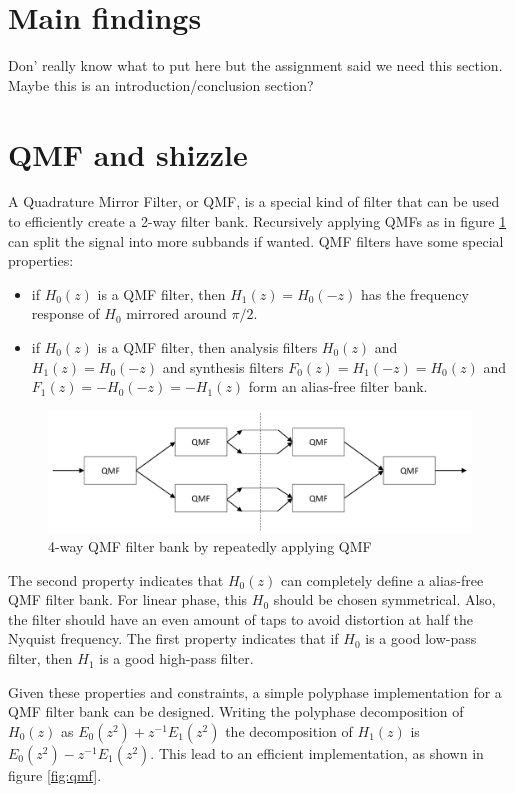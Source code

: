 \documentclass[a4paper]{article}
\begin{document}
\section{Main findings}
Don' really know what to put here but the assignment said we need this section. Maybe this is an introduction/conclusion section?

\section{QMF and shizzle}
A Quadrature Mirror Filter, or QMF, is a special kind of filter that can be used to efficiently create a 2-way filter bank. Recursively applying QMFs as in figure \ref{fig:qmfrecursive} can split the signal into more subbands if wanted. QMF filters have some special properties:
\begin{itemize}
\item if $H_0(z)$ is a QMF filter, then $H_1(z) = H_0(-z)$ has the frequency response of $H_0$ mirrored around $\pi/2$.
\item if $H_0(z)$ is a QMF filter, then analysis filters $H_0(z)$ and $H_1(z) = H_0(-z)$ and synthesis filters $F_0(z)=H_1(-z)=H_0(z)$ and $F_1(z)=-H_0(-z) = -H_1(z)$ form an alias-free filter bank.
\end{itemize}
\begin{figure}[hbt]
\centering
\includegraphics[width=.8\textwidth]{qmfrecursive}
\caption{4-way QMF filter bank by repeatedly applying QMF}
\label{fig:qmfrecursive}
\end{figure}
The second property indicates that $H_0(z)$ can completely define a alias-free QMF filter bank. For linear phase, this $H_0$ should be chosen symmetrical. Also, the filter should have an even amount of taps to avoid distortion at half the Nyquist frequency. The first property indicates that if $H_0$ is a good low-pass filter, then $H_1$ is a good high-pass filter.

Given these properties and constraints, a simple polyphase implementation for a QMF filter bank can be designed. Writing the polyphase decomposition of $H_0(z)$ as $E_0(z^2) + z^{-1} E_1(z^2)$ the decomposition of $H_1(z)$ is $E_0(z^2) - z^{-1} E_1(z^2)$. This lead to an efficient implementation, as shown in figure \ref{fig:qmf}.
\end{document}
